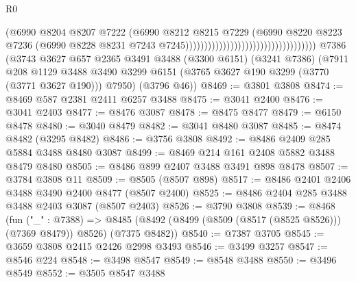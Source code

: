 \begin{lexlean}{R0}
\begin{coremodule}
                                                                  (@6990
                                                                    @8204
                                                                    @8207
                                                                    @7222
                                                                    (@6990
                                                                      @8212
                                                                      @8215
                                                                      @7229
                                                                      (@6990
                                                                        @8220
                                                                        @8223
                                                                        @7236
                                                                        (@6990
                                                                          @8228
                                                                          @8231
                                                                          @7243
                                                                          @7245)))))))))))))))))))))))))))))))))))
    @7386
    (@3743
      @3627
      @657
      @2365
      @3491
      @3488
      (@3300 @6151)
      (@3241 @7386)
      (@7911
        @208
        @1129
        @3488
        @3490
        @3299
        @6151
        (@3765 @3627 @190 @3299 (@3770 (@3771 @3627 @190)))
        @7950)
      (@3796 @46))
@8469 := @3801 @3808
@8474 := @8469 @587 @2381 @2411 @6257 @3488
@8475 := @3041 @2400
@8476 := @3041 @2403
@8477 := @8476 @3087
@8478 := @8475 @8477
@8479 := @6150 @8478
@8480 := @3040 @8479
@8482 := @3041 @8480 @3087
@8485 := @8474 @8482 (@3295 @8482)
@8486 := @3756 @3808
@8492 := @8486 @2409 @285 @5884 @3488 @8480 @3087
@8499 := @8469 @214 @161 @2408 @5882 @3488 @8479 @8480
@8505 := @8486 @899 @2407 @3488 @3491 @898 @8478
@8507 := @3784 @3808 @11
@8509 := @8505 (@8507 @898)
@8517 := @8486 @2401 @2406 @3488 @3490 @2400 @8477 (@8507 @2400)
@8525 := @8486 @2404 @285 @3488 @3488 @2403 @3087 (@8507 @2403)
@8526 := @3790 @3808
@8539 := @8468
    (fun ("_" : @7388) =>
    @8485 (@8492 (@8499 (@8509 (@8517 (@8525 @8526))) (@7369 @8479)) @8526) (@7375 @8482))
@8540 := @7387 @3705
@8545 := @3659 @3808 @2415 @2426 @2998 @3493
@8546 := @3499 @3257
@8547 := @8546 @224
@8548 := @3498 @8547
@8549 := @8548 @3488
@8550 := @3496 @8549
@8552 := @3505 @8547 @3488

\end{coremodule}
\end{lexlean}

